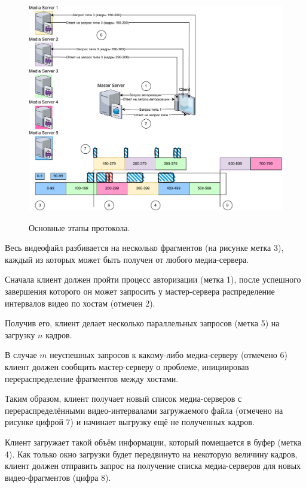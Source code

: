 \begin{figure}[h]
	\begin{center}
		{\includegraphics[scale = 0.8]{img/[all process].pdf}}
		\caption{Основные этапы протокола.}
		\label{image:general_process}
	\end{center}
\end{figure}

\pagebreak

Весь видеофайл разбивается на несколько фрагментов (на рисунке метка 3), каждый из которых может быть получен от любого медиа-сервера.

Сначала клиент должен пройти процесс авторизации (метка 1), после успешного завершения которого он может запросить у мастер-сервера распределение интервалов видео по хостам (отмечен 2). 

Получив его, клиент делает несколько параллельных запросов (метка 5) на загрузку $n$ кадров.

В случае $m$ неуспешных запросов к какому-либо медиа-серверу (отмечено 6) клиент должен сообщить мастер-серверу о проблеме, инициировав перераспределение фрагментов между хостами. 

Таким образом, клиент получает новый список медиа-серверов с перераспределёнными видео-интервалами загружаемого файла (отмечено на рисунке цифрой 7) и начинает выгрузку ещё не полученных кадров. 

Клиент загружает такой объём информации, который помещается в буфер (метка 4). Как только окно загрузки будет передвинуто на некоторую величину кадров, клиент должен отправить запрос на получение списка медиа-серверов для новых видео-фрагментов (цифра 8). \\

